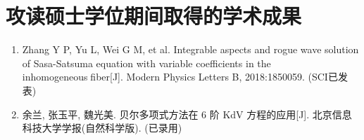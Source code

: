 \chapter{攻读硕士学位期间取得的学术成果}
\begin{enumerate}
\item Zhang Y P, Yu L, Wei G M, et al. Integrable aspects and rogue wave solution of Sasa-Satsuma equation with variable coefficients in the inhomogeneousfiber[J]. Modern Physics Letters B, 2018:1850059. (SCI已发表)

\item  余兰, 张玉平, 魏光美.  贝尔多项式方法在 6 阶 KdV 方程的应用[J]. 北京信息科技大学学报(自然科学版). (已录用) 
    
\end{enumerate}

%
%
